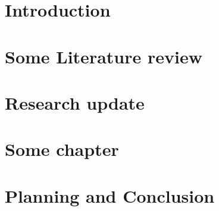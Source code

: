 \documentclass[10pt]{report}
\begin{document}


\doublespacing
 

\singlespacing          %
\listoffigures          %
\listoftables           %


 \tableofcontents


 \chapter{Introduction}     %


\chapter{Some Literature review}


 \chapter{Research update}
 

  \chapter{Some chapter}
 
 
 \chapter{Planning and Conclusion}
 

    

\printbibliography
\end{document}
